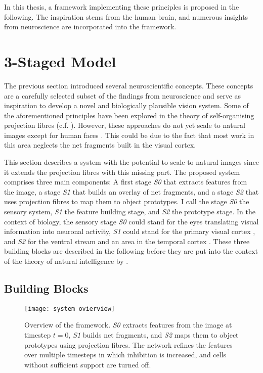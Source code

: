 In this thesis, a framework implementing these principles is proposed in the following.
The inspiration stems from the human brain, and numerous insights from neuroscience are incorporated into the framework.

\section{3-Staged Model}
The previous section introduced several neuroscientific concepts.
These concepts are a carefully selected subset of the findings from neuroscience and serve as inspiration to develop a novel and biologically plausible vision system.
Some of the aforementioned principles have been explored in the theory of self-organising projection fibres (c.f. ). However, these approaches do not yet scale to natural images except for human faces \cite{wolfrum_recurrent_2008}. This could be due to the fact that most work in this area neglects the net fragments built in the visual cortex.

This section describes a system with the potential to scale to natural images since it extends the projection fibres with this missing part.
The proposed system comprises three main components: A first stage \emph{S0} that extracts features from the image, a stage \emph{S1} that builds an overlay of net fragments, and a stage \emph{S2} that uses projection fibres to map them to object prototypes.
I call the stage \emph{S0} the sensory system, \emph{S1} the feature building stage, and \emph{S2} the prototype stage.
In the context of biology, the sensory stage \emph{S0} could stand for the eyes translating visual information into neuronal activity, \emph{S1} could stand for the primary visual cortex , and \emph{S2} for the ventral stream and an area in the temporal cortex .
These three building blocks are described in the following before they are put into the context of the theory of natural intelligence by .

\subsection{Building Blocks}
\begin{figure}[h]
    \centering
    \texttt{[image: system ovierview]}
    \caption[Overview of the framework]{Overview of the framework. \emph{S0} extracts features from the image at timestep $t=0$, \emph{S1} builds net fragments, and \emph{S2} maps them to object prototypes using projection fibres. The network refines the features over multiple timesteps in which inhibition is increased, and cells without sufficient support are turned off.}
\end{figure}


